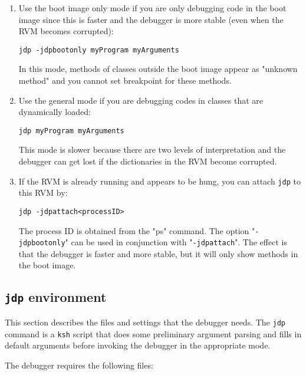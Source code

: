 \begin{enumerate}
\item Use the boot image only mode if you are only debugging code
in the boot image since this is faster and the debugger is more stable
(even when the RVM becomes corrupted):
\begin{verbatim}
jdp -jdpbootonly myProgram myArguments
\end{verbatim}
   In this mode, methods of classes outside the boot image appear
as "unknown method" and you cannot set breakpoint for these methods.


\item Use the general mode if you are debugging codes in classes that are 
dynamically loaded:
\begin{verbatim}
jdp myProgram myArguments
\end{verbatim}
   This mode is slower because there are two levels of interpretation
and the debugger can get lost if the dictionaries in the RVM become 
corrupted.


\item If the RVM is already running and appears to be hung, you can attach 
{\tt jdp} to this RVM by:
\begin{verbatim}
jdp -jdpattach<processID>
\end{verbatim}
   The process ID is obtained from the "ps" command.  
   The option "{\tt -jdpbootonly}" can be used in conjunction with 
   "{\tt -jdpattach}".  The effect is that the debugger is faster and more
   stable, but it will only show methods in the boot image.

\end{enumerate}


\subsection{{\tt jdp} environment}

   This section describes the files and settings that the debugger
needs.  The {\tt jdp} command is a {\tt ksh} script that does some preliminary
argument parsing and fills in default arguments before invoking the
debugger in the appropriate mode.

The debugger requires the following files:

